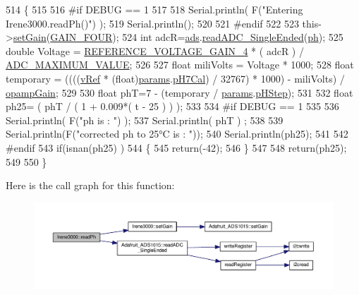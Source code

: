\begin{DoxyCode}
514 \{
515 
516 \textcolor{preprocessor}{#if DEBUG == 1 }
517 
518     Serial.println( F(\textcolor{stringliteral}{"Entering Irene3000.readPh()"}) );
519     Serial.println();
520 
521 \textcolor{preprocessor}{#endif }
522 
523     this->\hyperlink{class_irene3000_aff7c5da186b388e7272e63ff88a20c34}{setGain}(\hyperlink{_cool_adafruit___a_d_s1015_8h_a3d6c0e15829a207b9155890811fa4781a33fa5521f4e806b7438052fcdbbf8660}{GAIN\_FOUR});
524     \textcolor{keywordtype}{int} adcR=\hyperlink{class_irene3000_a1215e77ba761c9908d80d691f149e135}{ads}.\hyperlink{class_adafruit___a_d_s1015_a40f38b9e1f3ec397c0670dd632510235}{readADC\_SingleEnded}(\hyperlink{_irene3000_8h_af771ceafe0e6524dd8497d4305dfe778}{ph});
525     \textcolor{keywordtype}{double} Voltage =  \hyperlink{_irene3000_8h_a51af1d267f8d2e05eff1e4f5c88d02e5}{REFERENCE\_VOLTAGE\_GAIN\_4} * ( adcR ) / 
      \hyperlink{_irene3000_8h_ae04444a85a37b5dce09107f2ce2b2c80}{ADC\_MAXIMUM\_VALUE};
526 
527     \textcolor{keywordtype}{float} miliVolts = Voltage * 1000;
528     \textcolor{keywordtype}{float} temporary = ((((\hyperlink{class_irene3000_a018e7ff9bee57e6d2b298667a668ba7e}{vRef} * (float)\hyperlink{class_irene3000_a136585a5ee7f9ac6ab52175fa153f8e3}{params}.\hyperlink{struct_irene3000_1_1parameters___t_a21265466a570d84bff914f26d2f7a03e}{pH7Cal}) / 32767) * 1000) - miliVolts) / 
      \hyperlink{class_irene3000_a4e588985ca74e5076029d5dee81034f2}{opampGain};
529     
530     \textcolor{keywordtype}{float} phT=7 - (temporary / \hyperlink{class_irene3000_a136585a5ee7f9ac6ab52175fa153f8e3}{params}.\hyperlink{struct_irene3000_1_1parameters___t_a61cfcc2539d5f630e9071f3753aba9fe}{pHStep});
531 
532     \textcolor{keywordtype}{float} ph25= ( phT / ( 1 + 0.009*( t - 25 ) ) );
533 
534 \textcolor{preprocessor}{#if DEBUG == 1 }
535 
536     Serial.println( F(\textcolor{stringliteral}{"ph is : "}) );
537     Serial.println( phT ) ;
538     
539     Serial.println(F(\textcolor{stringliteral}{"corrected ph to 25°C is : "}));
540     Serial.println(ph25);
541 
542 \textcolor{preprocessor}{#endif }
543     \textcolor{keywordflow}{if}(isnan(ph25) )
544     \{
545         \textcolor{keywordflow}{return}(-42);    
546     \}
547 
548     \textcolor{keywordflow}{return}(ph25);
549 
550 \}
\end{DoxyCode}
Here is the call graph for this function\+:\nopagebreak
\begin{figure}[H]
\begin{center}
\leavevmode
\includegraphics[width=350pt]{d6/d03/class_irene3000_a436fc0a06681cd0784aba56b9707f19a_cgraph}
\end{center}
\end{figure}
